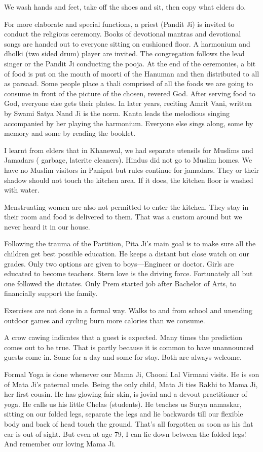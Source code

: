 We wash hands and feet, take off the shoes and sit, then copy what elders
do. 

For more elaborate and special functions, a priest (Pandit Ji) is invited
to conduct the religious ceremony. Books of devotional mantras and
devotional songs are handed out to everyone sitting on cushioned floor.
A harmonium and dholki (two sided drum) player are invited. The
congregation follows the lead singer or the Pandit Ji conducting the
pooja. At the end of the ceremonies, a bit of food is put on the mouth of
moorti of the Hanuman and then distributed to all as parsaad. Some people
place a thali comprised of all the foods we are going to consume in front
of the picture of the chosen, revered God. After serving food to God,
everyone else gets their plates. In later years, reciting Amrit Vani,
written by Swami Satya Nand Ji is the norm. Kanta leads the melodious
singing accompanied by her playing the harmonium. Everyone else sings
along, some by memory and some by reading the booklet. 

I learnt from elders that in Khanewal, we had separate utensils for
Muslims and Jamadars ( garbage, laterite cleaners). Hindus did not go to
Muslim homes. We have no Muslim visitors in Panipat but rules continue for
jamadars. They or their shadow should not touch the kitchen area. If it
does, the kitchen floor is washed with water. 

Menstruating women are also not permitted to enter the kitchen. They stay
in their room and food is delivered to them. That was a custom around but
we never heard it in our house. 

Following the trauma of the Partition, Pita Ji’s main goal is to make sure
all the children get best possible education. He keeps a distant but close
watch on our grades. Only two options are given to boys—Engineer or
doctor. Girls are educated to become teachers. Stern love is the driving
force. Fortunately all but one followed the dictates. Only Prem started
job after Bachelor of Arts, to financially support the family. 

Exercises are not done in a formal way. Walks to and from school and
unending outdoor games and cycling burn more calories than we consume. 

A crow cawing indicates that a guest is expected. Many times the
prediction comes out to be true. That is partly because it is common to
have unannounced guests come in. Some for a day and some for stay. Both
are always welcome. 

Formal Yoga is done whenever our Mama Ji, Chooni Lal Virmani visits. He is
son of Mata Ji’s paternal uncle. Being the only child, Mata Ji ties Rakhi
to Mama Ji, her first cousin. He has glowing fair skin, is jovial and
a devout practitioner of yoga. He calls us his little Chelas (students).
He teaches us Surya namaskar, sitting on our folded legs, separate the
legs and lie backwards till our flexible body and back of head touch the
ground. That’s all forgotten as soon as his fiat car is out of sight. But
even at age 79, I can lie down between the folded legs! And remember our
loving Mama Ji. 

